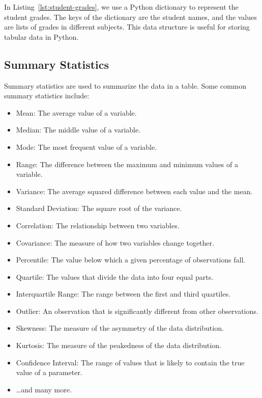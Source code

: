 In Listing~\ref{lst:student-grades}, we use a Python dictionary to represent the student grades. The keys of the dictionary are the student names, and the values are lists of grades in different subjects. This data structure is useful for storing tabular data in Python.

\subsection{Summary Statistics}

Summary statistics are used to summarize the data in a table. Some common summary statistics include:

\begin{itemize}
    \item Mean: The average value of a variable.
    \item Median: The middle value of a variable.
    \item Mode: The most frequent value of a variable.
    \item Range: The difference between the maximum and minimum values of a variable.
    \item Variance: The average squared difference between each value and the mean.
    \item Standard Deviation: The square root of the variance.
    \item Correlation: The relationship between two variables.
    \item Covariance: The measure of how two variables change together.
    \item Percentile: The value below which a given percentage of observations fall.
    \item Quartile: The values that divide the data into four equal parts.
    \item Interquartile Range: The range between the first and third quartiles.
    \item Outlier: An observation that is significantly different from other observations.
    \item Skewness: The measure of the asymmetry of the data distribution.
    \item Kurtosis: The measure of the peakedness of the data distribution.
    \item Confidence Interval: The range of values that is likely to contain the true value of a parameter.
    \item \ldots and many more.
\end{itemize}

